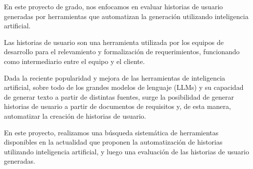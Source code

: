 
En este proyecto de grado, nos enfocamos en evaluar historias de usuario generadas por herramientas que automatizan la generación utilizando inteligencia artificial. 

Las historias de usuario son una herramienta utilizada por los equipos de desarrollo para el relevamiento y formalización de requerimientos, funcionando como intermediario entre el equipo y el cliente.

Dada la reciente popularidad y mejora de las herramientas de inteligencia artificial, sobre todo de los grandes modelos de lenguaje (LLMs) y su capacidad de generar texto a partir de distintas fuentes, surge la posibilidad de generar historias de usuario a partir de documentos de requisitos y, de esta manera, automatizar la creación de historias de usuario.

En este proyecto, realizamos una búsqueda sistemática de herramientas disponibles en la actualidad que proponen la automatización de historias utilizando inteligencia artificial, y luego una evaluación de las historias de usuario generadas.

\hfill \break
{}